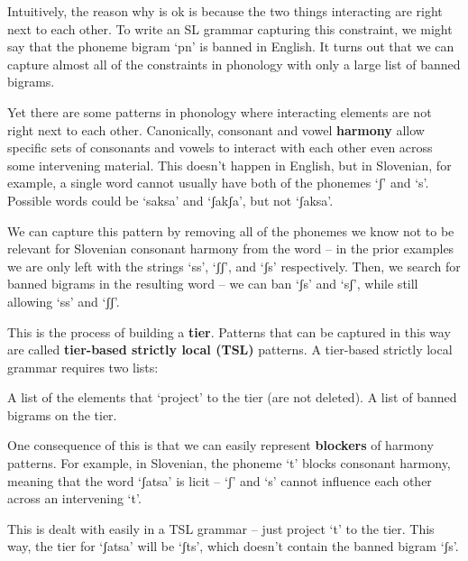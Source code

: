 Intuitively, the reason why \Last[a] is ok is because the two things interacting are right next to each other. To write an SL grammar capturing this constraint, we might say that the phoneme bigram `pn' is banned in English. It turns out that we can capture almost all of the constraints in phonology with only a large list of banned bigrams.

Yet there are some patterns in phonology where interacting elements are not right next to each other. Canonically, consonant and vowel \textbf{harmony} allow specific sets of consonants and vowels to interact with each other even across some intervening material. This doesn't happen in English, but in Slovenian, for example, a single word cannot usually have both of the phonemes `ʃ' and `s'. Possible words could be `saksa' and `ʃakʃa', but not `ʃaksa'.

We can capture this pattern by removing all of the phonemes we know not to be relevant for Slovenian consonant harmony from the word -- in the prior examples we are only left with the strings `ss', `ʃʃ', and `ʃs' respectively. Then, we search for banned bigrams in the resulting word -- we can ban `ʃs' and `sʃ', while still allowing `ss' and `ʃʃ'.

This is the process of building a \textbf{tier}. Patterns that can be captured in this way are called \textbf{tier-based strictly local (TSL)} patterns. A tier-based strictly local grammar requires two lists:

\pex \a A list of the elements that `project' to the tier (are not deleted).
    \a A list of banned bigrams on the tier.
\xe

One consequence of this is that we can easily represent \textbf{blockers} of harmony patterns. For example, in Slovenian, the phoneme `t' blocks consonant harmony, meaning that the word `ʃatsa' is licit -- `ʃ' and `s' cannot influence each other across an intervening `t'.

This is dealt with easily in a TSL grammar -- just project `t' to the tier. This way, the tier for `ʃatsa' will be `ʃts', which doesn't contain the banned bigram `ʃs'.
